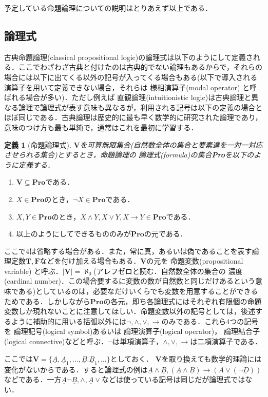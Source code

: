 \documentclass{ltjsarticle}
\theoremstyle{mystyle1}
\newtheorem{dfn}{定義}[section]
\theoremstyle{mystyle3}
\theoremstyle{mystyle2}
\newcommand{\uA}{\underline{A}}
\newcommand{\uB}{\underline{B}}
\newcommand{\uD}{\underline{D}}
\newcommand{\bT}{\ensuremath{\mathbf{T}}}
\newcommand{\bF}{\ensuremath{\mathbf{F}}}
\newcommand{\bV}{\ensuremath{\mathbf{V}}}
\newcommand{\bPro}{\ensuremath{\mathbf{Pro}}}
\newcommand{\red}[1]{{\color{red} #1}}
\begin{document}
予定している命題論理についての説明はとりあえず以上である．
\subsection{論理式}
古典命題論理(classical propositional logic)の論理式は以下のようにして定義される．ここでわざわざ古典と付けたのは古典的でない論理もあるからで，それらの場合には以下に出てくる以外の記号が入ってくる場合もある(以下で導入される演算子を用いて定義できない場合，それらは\red{様相演算子}(modal operator) と呼ばれる場合が多い)．ただし例えば\red{直観論理}(intuitionistic logic)は古典論理と異なる論理で論理式が表す意味も異なるが，利用される記号は以下の定義の場合とほぼ同じである．古典論理は歴史的に最も早く数学的に研究された論理であり，意味のつけ方も最も単純で，通常はこれを最初に学習する．
\begin{dfn}[命題論理式]\label{dfn:formula}
$\bV$を可算無限集合(自然数全体の集合と要素達を一対一対応させられる集合)とするとき，命題論理の\red{論理式}(formula)の集合\textbf{Pro}を以下のように定義する．
\end{dfn}
\begin{enumerate}
  \item $\bV\subseteq\bPro$である．
  \item $X\in\bPro$のとき，$\neg X\in\bPro$である．
  \item $X,Y\in\bPro$のとき，$X\wedge Y,X\vee Y,X\to Y\in\bPro$である．
  \item 以上のようにしてできるもののみが$\bPro$の元である．
\end{enumerate}
ここで4は省略する場合がある．また，常に真，あるいは偽であることを表す論理定数$\bT,\bF$などを付け加える場合もある．$\bV$の元を\red{命題変数}(propositional variable) と呼ぶ．$|\bV|= \aleph_0$(アレフゼロと読む．自然数全体の集合の\red{濃度}(cardinal number)．この場合要するに変数の数が自然数と同じだけあるという意味である)としているのは，必要なだけいくらでも変数を用意することができるためである．しかしながら$\bPro$の各元，即ち各論理式にはそれぞれ有限個の命題変数しか現れないことに注意してほしい．命題変数以外の記号としては，後述するように補助的に用いる括弧以外には$\neg,\wedge,\vee,\to$のみである．これら4つの記号を\red{論理記号}(logical symbol)あるいは\red{論理演算子}(logical operator)，\red{論理結合子}(logical connective)などと呼ぶ．$\neg$は単項演算子，$\wedge,\vee,\to$は二項演算子である．

ここでは$\bV = \{\uA, \uA_1, \ldots, \uB. \uB_1, \ldots\}$としておく． $\bV$を取り換えても数学的理論には変化がないからである．すると論理式の例は$\uA\wedge\uB, \left(\uA\wedge\uB\right) \to \left(A\vee\left(\neg \uD\right)\right)$などである．一方$\uA\neg\uB, \wedge, \uA\vee$などは使っている記号は同じだが論理式ではない．
\end{document}
